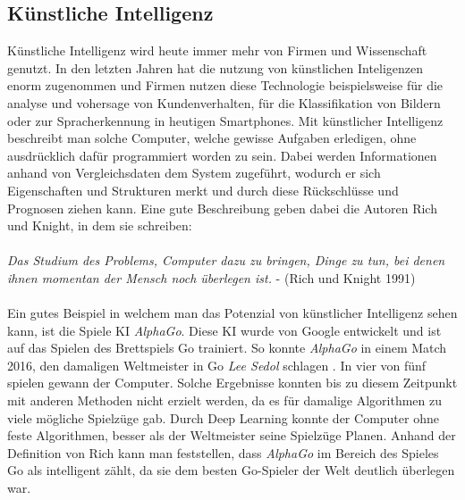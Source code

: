 \documentclass[a4paper,12pt,oneside]{article}
\begin{document}
  \subsection{Künstliche Intelligenz}\label{s.ki}
Künstliche Intelligenz wird heute immer mehr von Firmen und Wissenschaft genutzt. In den letzten Jahren hat die nutzung von künstlichen Inteligenzen enorm zugenommen und Firmen nutzen diese Technologie beispielsweise für die analyse und vohersage von Kundenverhalten, für die Klassifikation von Bildern oder zur Spracherkennung in heutigen Smartphones. Mit künstlicher Intelligenz beschreibt man solche Computer, welche gewisse Aufgaben erledigen, ohne ausdrücklich dafür programmiert worden zu sein. Dabei werden Informationen anhand von Vergleichsdaten dem System zugeführt, wodurch er sich Eigenschaften und Strukturen merkt und durch diese Rückschlüsse und Prognosen ziehen kann. Eine gute Beschreibung geben dabei die Autoren Rich und Knight, in dem sie schreiben:\\\\
 \textit{Das Studium des Problems, Computer dazu zu bringen, Dinge zu tun, bei denen ihnen momentan der Mensch noch überlegen ist.} - (Rich und Knight 1991)\\\\
Ein gutes Beispiel in welchem man das Potenzial von künstlicher Intelligenz sehen kann, ist die Spiele KI  \textit{AlphaGo}. Diese KI wurde von Google entwickelt und ist auf das Spielen des Brettspiels Go trainiert. So konnte \textit{AlphaGo} in einem Match 2016, den damaligen Weltmeister in Go \textit{Lee Sedol} schlagen \cite{Alpha2016GO}. In vier von fünf spielen gewann der Computer. Solche Ergebnisse konnten bis zu diesem Zeitpunkt mit anderen Methoden nicht erzielt werden, da es für damalige Algorithmen zu viele mögliche Spielzüge gab. Durch Deep Learning konnte der Computer ohne feste Algorithmen, besser als der Weltmeister seine Spielzüge Planen. Anhand der Definition von Rich kann man feststellen, dass  \textit{AlphaGo}  im Bereich des Spieles Go als intelligent zählt, da sie dem besten Go-Spieler der Welt deutlich überlegen war.
\end{document}
